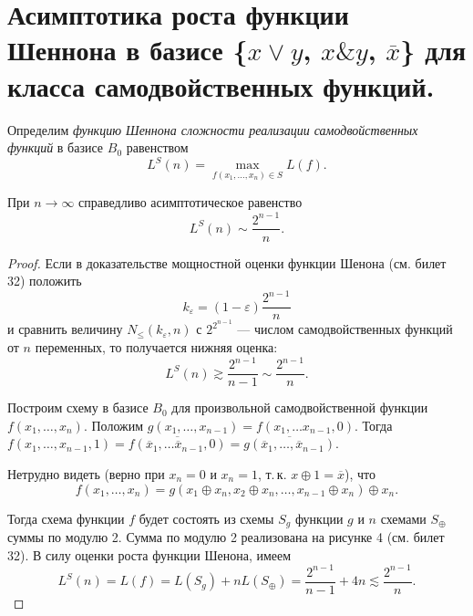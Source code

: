 \section{Асимптотика роста функции Шеннона в базисе \{$x\vee y$, $x \& y$, $\overline{x}$\} для класса самодвойственных функций.}

\begin{definition}
    Определим \textit{функцию Шеннона сложности реализации самодвойственных функций} в базисе $B_0$ равенством
    \[
        L^S(n) = \max_{f(x_1,\ldots,x_n)\in S} L(f).
    \]

    \begin{theorem}
        При $n\to \infty$ справедливо асимптотическое равенство
        \[
            L^S(n) \sim \frac{2^{n-1}}{n}.
        \]
    \end{theorem}

    \begin{proof}
        Если в доказательстве мощностной оценки функции Шенона (см. билет 32) положить
        \[
            k_{\varepsilon} = (1-\varepsilon)\frac{2^{n-1}}{n}
        \] 
        и сравнить величину $N_{\leqslant}(k_{\varepsilon}, n)$ с $2^{2^{n-1}}$ --- числом самодвойственных функций от $n$ переменных, то получается нижняя оценка:
        \[
            L^S(n)\gtrsim \frac{2^{n-1}}{n-1}\sim \frac{2^{n-1}}{n}.
        \]
        
        Построим схему в базисе $B_0$ для произвольной самодвойственной функции $f(x_1, \ldots, x_n)$. Положим $g(x_1, \ldots, x_{n-1}) = f(x_1, \ldots x_{n-1}, 0)$. Тогда
        $f(x_1, \ldots, x_{n-1}, 1) = \overline{f(\overline{x}_1, \ldots \overline{x}_{n-1}, 0)} = \overline{g(\overline{x}_1, \ldots, \overline{x}_{n-1})}$.

        Нетрудно видеть (верно при $x_n=0$ и $x_n = 1$, т.\,к. $x\oplus 1 = \overline{x}$), что 
        \[
            f(x_1, \ldots, x_n) = g(x_1 \oplus x_n, x_2 \oplus x_n, \ldots, x_{n-1} \oplus x_n) \oplus x_n.
        \]

        Тогда схема функции $f$ будет состоять из схемы $S_g$ функции $g$ и $n$ схемами $S_{\oplus}$ суммы по модулю 2. Сумма по модулю 2 реализована на рисунке 4 (см. билет 32). В силу оценки роста функции Шенона, имеем
        \[
            L^S(n) = L(f) = L(S_g) + nL(S_{\oplus}) = \frac{2^{n-1}}{n-1} + 4n \lesssim \frac{2^{n-1}}{n}.
        \]
    \end{proof}
\end{definition}